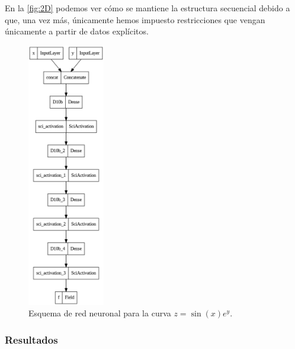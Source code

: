 En la \autoref{fig:2D} podemos ver cómo se mantiene la estructura secuencial debido a que, una vez más, únicamente hemos impuesto restricciones que vengan únicamente a partir de datos explícitos. 

 \begin{figure}[htbp]
    \centering
    \includegraphics[width=0.3\textwidth]{img/2D.png}
    \caption{Esquema de red neuronal para la curva $z=\sin(x)e^{y}$.}
    \label{fig:2D}
\end{figure}

\subsubsection{Resultados}

